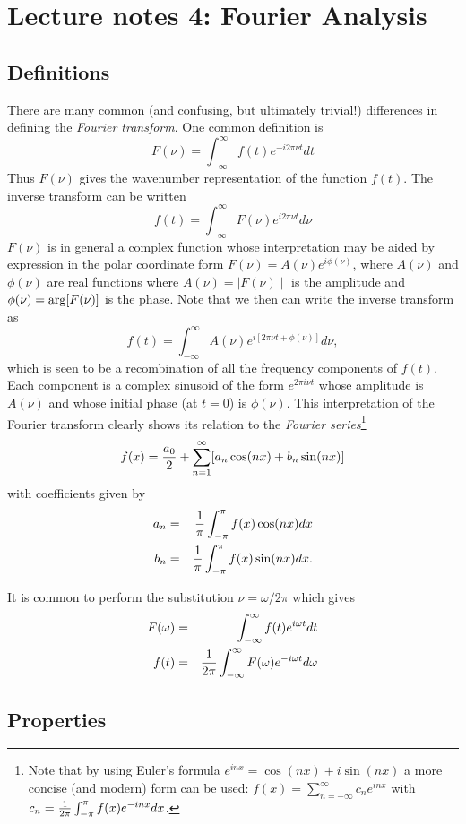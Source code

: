 \documentclass{article}
\newcommand{\bua}{\begin{eqnarray*}}
\newcommand{\eua}{\end{eqnarray*}}
\newcommand{\infint}{\int_{-\infty}^{\infty}}
\def\labs{\mid\!}
\def\rabs{\!\mid}
\begin{document}
\section*{Lecture notes 4: Fourier Analysis}

\subsection*{Definitions}

There are many common (and confusing, but ultimately trivial!)
differences in defining the {\it Fourier transform}. One common 
definition is 
\[
F(\nu)=\infint f(t)e^{-i2\pi\nu t}dt
\]
Thus $F(\nu)$ gives the wavenumber representation of the function
$f(t)$. The inverse transform can be written 
\[
f(t)=\infint F(\nu)e^{i2\pi\nu t}d\nu
\]
$F(\nu)$ is in general a complex function whose interpretation may be
aided by expression in the polar coordinate form
$F(\nu)=A(\nu)e^{i\phi(\nu)}$, where $A(\nu)$ and $\phi(\nu)$ are real
functions where $A(\nu)=\labs{F(\nu)}\rabs$ is the amplitude and $\phi(\nu)={\rm
  arg}[F(\nu)]$  is the phase. Note that we then can write the inverse 
transform as 
\[
f(t)=\infint A(\nu)e^{i[2\pi\nu t+\phi(\nu)]}d\nu,
\]
which is seen to be a recombination of all the frequency components of
$f(t)$. Each component is a complex sinusoid of the form $e^{2\pi i\nu t}$
whose amplitude is $A(\nu)$ and whose initial phase (at $t=0$) is
$\phi(\nu)$. This interpretation of the Fourier transform clearly
shows its relation to the {\it Fourier series}\footnote{Note that by 
using Euler's formula $e^{inx}=\cos(nx)+i\sin(nx)$ a more concise (and
modern) form can be used: $f(x)=\sum_{n=-\infty}^\infty c_n e^{inx}$
with $c_n={1\over 2\pi}\int_{-\pi}^{\pi} f(x)e^{-inx}dx$.} 
\[
f(x)={a_0\over 2}+\sum_{n=1}^\infty[a_n\cos(nx)+b_n\sin(nx)]
\]
with coefficients given by 
\bua
a_n & = & {1\over\pi}\int_{-\pi}^\pi f(x)\cos(nx)dx \\
b_n & = & {1\over\pi}\int_{-\pi}^\pi f(x)\sin(nx)dx.
\eua

It is common to perform the substitution $\nu={\omega/2\pi}$ which
gives
\bua
F(\omega)&=&\infint f(t)e^{i\omega t}dt \\
f(t)&=&{1\over 2\pi}\infint F(\omega)e^{-i\omega t}d\omega
\eua

\subsection*{Properties}
\end{document}
